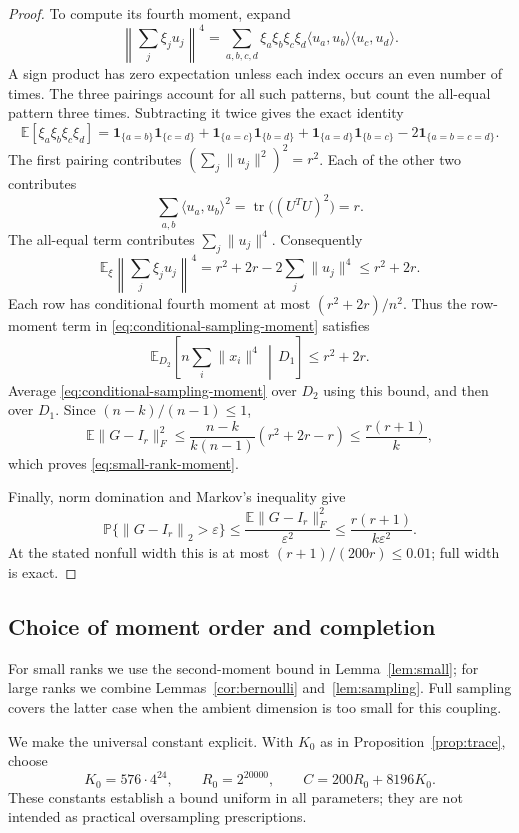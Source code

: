 \documentclass[11pt]{article}
\theoremstyle{definition}
\theoremstyle{remark}
\theoremstyle{plain}
\newcommand{\E}{\mathbb E}
\newcommand{\Prob}{\mathbb P}
\newcommand{\one}{\mathbf 1}
\DeclareMathOperator{\tr}{tr}
\newcommand{\norm}[1]{\left\lVert#1\right\rVert_2}
\begin{document}
\begin{proof}
To compute its fourth moment, expand
\[
 \left\|\sum_j\xi_j u_j\right\|^4
   =\sum_{a,b,c,d}\xi_a\xi_b\xi_c\xi_d
                    \langle u_a,u_b\rangle\langle u_c,u_d\rangle.
\]
A sign product has zero expectation unless each index occurs an
even number of times. The three pairings account for all such
patterns, but count the all-equal pattern three times. Subtracting
it twice gives the exact identity
\[
 \E[\xi_a\xi_b\xi_c\xi_d]
   =\one_{\{a=b\}}\one_{\{c=d\}}
     +\one_{\{a=c\}}\one_{\{b=d\}}
     +\one_{\{a=d\}}\one_{\{b=c\}}
     -2\one_{\{a=b=c=d\}}.
\]
The first pairing contributes $(\sum_j\|u_j\|^2)^2=r^2$.
Each of the other two contributes
\[
 \sum_{a,b}\langle u_a,u_b\rangle^2
    =\tr\bigl((U^TU)^2\bigr)=r.
\]
The all-equal term contributes $\sum_j\|u_j\|^4$. Consequently
\[
 \E_{\xi}\left\|\sum_j\xi_j u_j\right\|^4
             =r^2+2r-2\sum_j\|u_j\|^4\le r^2+2r.
\]
Each row has conditional fourth moment at most $(r^2+2r)/n^2$.
Thus the row-moment
term in \eqref{eq:conditional-sampling-moment} satisfies
\[
 \E_{D_2}\!\left[n\sum_i\|x_i\|^4\,\middle|\,D_1\right]
       \le r^2+2r.
\]
Average \eqref{eq:conditional-sampling-moment} over $D_2$ using
this bound, and then over $D_1$. Since $(n-k)/(n-1)\le1$,
\[
 \E\|G-I_r\|_F^2
    \le\frac{n-k}{k(n-1)}(r^2+2r-r)
    \le\frac{r(r+1)}k,
\]
which proves \eqref{eq:small-rank-moment}.

Finally, norm domination and Markov's inequality give
\[
 \Prob\{\norm{G-I_r}>\varepsilon\}
    \le\frac{\E\|G-I_r\|_F^2}{\varepsilon^2}
    \le\frac{r(r+1)}{k\varepsilon^2}.
\]
At the stated nonfull width this is at most
\((r+1)/(200r)\le0.01\); full width is exact.
\end{proof}
\subsection{Choice of moment order and completion}

For small ranks we use the second-moment bound in
Lemma~\ref{lem:small}; for large ranks we combine
Lemmas~\ref{cor:bernoulli} and~\ref{lem:sampling}.
Full sampling covers the latter case when the ambient dimension
is too small for this coupling.

We make the universal constant explicit. With $K_0$ as in
Proposition~\ref{prop:trace}, choose
\begin{equation}\label{eq:universal-constants}
 K_0=576\cdot4^{24},\qquad R_0=2^{20000},\qquad
 C=200R_0+8196K_0.
\end{equation}
These constants establish a bound uniform in all parameters; they
are not intended as practical oversampling prescriptions.
\end{document}
